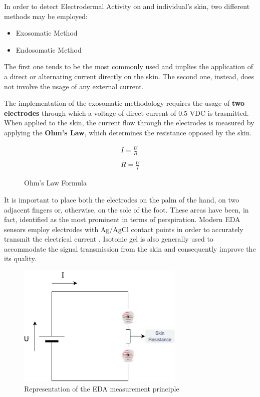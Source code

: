 In order to detect Electrodermal Activity on and individual's skin, two different methods may be employed:

\begin{itemize}
    \item Exosomatic Method
    \item Endosomatic Method
\end{itemize}

The first one tends to be the most commonly used and implies the application of a direct or alternating current directly on the skin. The second one, instead, does not involve the usage of any external current.

The implementation of the exosomatic methodology requires the usage of \textbf{two electrodes} through which a voltage of direct current of 0.5 VDC is trasmitted. When applied to the skin, the current flow through the electrodes is measured by applying the \textbf{Ohm's Law}, which determines the resistance opposed by the skin.

\begin{figure}[h]
    \begin{equation}
    \begin{aligned}
    I = \frac{U}{R} \\
    \\
    R = \frac{U}{I}
    \end{aligned}
    \end{equation}
    \caption{Ohm's Law Formula}
    \label{fig:ohmlaw}
\end{figure}

It is important to place both the electrodes on the palm of the hand, on two adjacent fingers or, otherwise, on the sole of the foot. These areas have been, in fact, identified as the most prominent in terms of perspiration. Modern EDA sensors employ electrodes with Ag/AgCl contact points in order to accurately transmit the electrical current \cite{eda-imotions}. Isotonic gel is also generally used to accommodate the signal transmission from the skin and consequently improve the its quality.

\begin{figure}[h]
    \centering
    \includegraphics[width=8cm]{./images/skin-resistance.drawio.png}
    \caption{Representation of the EDA measurement principle}
    \label{fig:eda-ans}
\end{figure}

